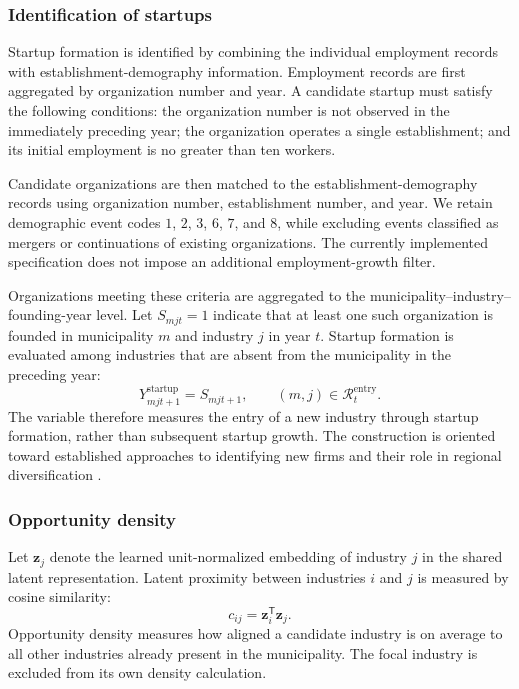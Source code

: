 \documentclass[9pt,twoside]{pnas-new}
\begin{document}
\subsubsection{Identification of startups}
\label{subsubsec:regional_startups}

Startup formation is identified by combining the individual employment records
with establishment-demography information. Employment records are first
aggregated by organization number and year. A candidate startup must satisfy
the following conditions: the organization number is not observed in the
immediately preceding year; the organization operates a single establishment;
and its initial employment is no greater than ten workers.

Candidate organizations are then matched to the establishment-demography
records using organization number, establishment number, and year. We retain
demographic event codes \(1\), \(2\), \(3\), \(6\), \(7\), and \(8\), while
excluding events classified as mergers or continuations of existing
organizations. The currently implemented specification does not impose an
additional employment-growth filter.

Organizations meeting these criteria are aggregated to the
municipality--industry--founding-year level. Let \(S_{mjt}=1\) indicate that
at least one such organization is founded in municipality \(m\) and
industry \(j\) in year \(t\). Startup formation is evaluated among industries
that are absent from the municipality in the preceding year:
\[
Y^{\mathrm{startup}}_{mjt+1}
 =
 S_{mjt+1},
 \qquad
 (m,j)\in\mathcal{R}^{\mathrm{entry}}_t.
\]
The variable therefore measures the entry of a new industry through startup
formation, rather than subsequent startup growth. The construction is
oriented toward established approaches to identifying new firms and their role
in regional diversification
\cite{anderssonCharacteristicsPerformanceNew2013,
grillitschDoesTimingIntegrating2021}.

\subsubsection{Opportunity density}
\label{subsubsec:regional_opportunity_density}

Let \(\mathbf{z}_j\) denote the learned unit-normalized embedding of industry
\(j\) in the shared latent representation. Latent proximity between industries \(i\) and \(j\) is measured by cosine similarity:
\[
c_{ij}
 =
 \mathbf{z}_i^{\mathsf T}\mathbf{z}_j.
\]
Opportunity density measures how aligned a candidate industry is on average to all other industries already present in the municipality. The focal
industry is excluded from its own density calculation.
\end{document}

